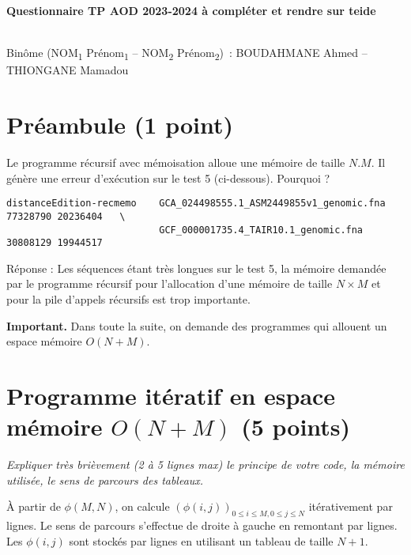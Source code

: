 \documentclass[10pt,a4paper]{article}
\begin{document}
\thispagestyle{empty}

\noindent\centerline{\bf\large Questionnaire  TP AOD 2023-2024 à compléter et rendre sur teide  } \\
Binôme 
(NOM\textsubscript{1} Prénom\textsubscript{1} --
 NOM\textsubscript{2} Prénom\textsubscript{2})
\,: BOUDAHMANE Ahmed -- THIONGANE Mamadou

\section{Préambule (1 point)}
Le programme récursif avec mémoisation alloue une mémoire de taille $N.M$.
Il génère une erreur d'exécution sur le test 5 (ci-dessous). Pourquoi ?

\begin{verbatim}
distanceEdition-recmemo    GCA_024498555.1_ASM2449855v1_genomic.fna 77328790 20236404   \
                           GCF_000001735.4_TAIR10.1_genomic.fna 30808129 19944517 
\end{verbatim}

\noindent Réponse : Les séquences étant très longues sur le test 5, la mémoire demandée par le programme récursif pour l'allocation d'une mémoire de taille $N \times M$ et pour la pile d'appels récursifs est trop importante.

\medskip

{\noindent\bf{Important}.} Dans toute la suite, on demande des programmes qui allouent un espace mémoire $O(N+M)$.

\section{Programme itératif en espace mémoire $O(N+M)$ (5 points)}
{\em Expliquer très brièvement (2 à 5 lignes max) le principe de votre code, la mémoire utilisée, le sens de parcours des tableaux.}

\medskip

À partir de $\phi(M,N)$, on calcule $\left( \phi(i,j) \right)_{0 \leqslant i \leqslant M, 0 \leqslant j \leqslant N}$ itérativement par lignes. Le sens de parcours s'effectue de droite à gauche en remontant par lignes. Les $\phi(i,j)$ sont stockés par lignes en utilisant un tableau de taille $N+1$.

\medskip
\end{document}
